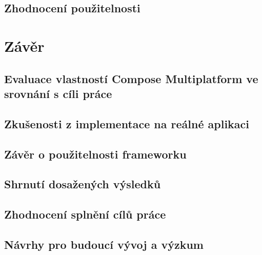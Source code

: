 \section{Zhodnocení použitelnosti}

\chapter{Závěr}

\section{Evaluace vlastností Compose Multiplatform ve srovnání s cíli práce}
\section{Zkušenosti z implementace na reálné aplikaci}
\section{Závěr o použitelnosti frameworku}

\section{Shrnutí dosažených výsledků}
\section{Zhodnocení splnění cílů práce}
\section{Návrhy pro budoucí vývoj a výzkum}


